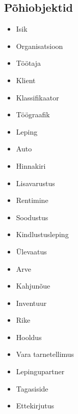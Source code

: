 \subsection{Põhiobjektid}
\begin{itemize}
	\item Isik
	\item Organisatsioon
	\item Töötaja
	\item Klient
	\item Klassifikaator
	\item Töögraafik
	\item Leping
	\item Auto
	\item Hinnakiri
	\item Lisavarustus
	\item Rentimine
	\item Soodustus
	\item Kindlustusleping
	\item Ülevaatus
	\item Arve
	\item Kahjunõue
	\item Inventuur
	\item Rike
	\item Hooldus
	\item Vara tarnetellimus
	\item Lepingupartner
	\item Tagasiside
	\item Ettekirjutus
\end{itemize}

